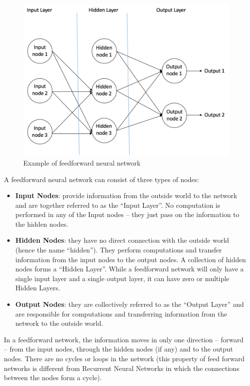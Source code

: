 \documentclass{article}
\begin{document}
\begin{figure}[!ht]
	\centering
		\includegraphics[width=\columnwidth]{images/feedforward-ff.png}
		\caption{Example of feedforward neural network}\label{feedforward-ff}
	\label{fig:graph}
\end{figure}

A feedforward neural network can consist of three types of nodes:

\begin{itemize}
  \item \textbf{Input Nodes}: provide information from the outside world to the network and are together referred to as the “Input Layer”. No computation is performed in any of the Input nodes – they just pass on the information to the hidden nodes.
  \item \textbf{Hidden Nodes}: they have no direct connection with the outside world (hence the name “hidden”). They perform computations and transfer information from the input nodes to the output nodes. A collection of hidden nodes forms a “Hidden Layer”. While a feedforward network will only have a single input layer and a single output layer, it can have zero or multiple Hidden Layers.
  \item \textbf{Output Nodes}: they are collectively referred to as the “Output Layer” and are responsible for computations and transferring information from the network to the outside world.
\end{itemize}

In a feedforward network, the information moves in only one direction – forward – from the input nodes, through the hidden nodes (if any) and to the output nodes. There are no cycles or loops in the network (this property of feed forward networks is different from Recurrent Neural Networks in which the connections between the nodes form a cycle).
\end{document}
